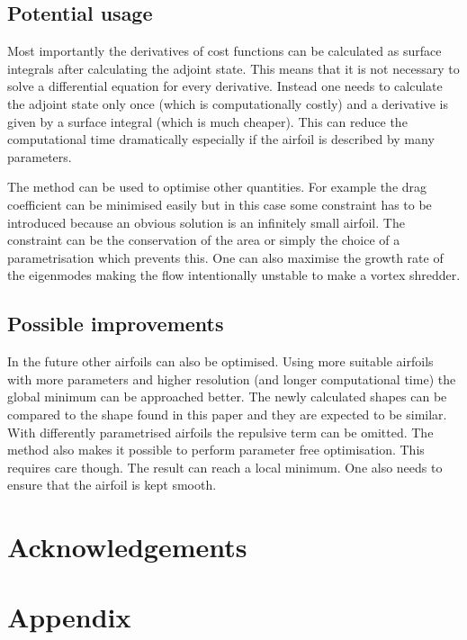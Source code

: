 \documentclass[12pt, a4paper]{article}
\begin{document}
        \subsection{Potential usage}
            Most importantly the derivatives of cost functions can be calculated as surface integrals after calculating the adjoint state. This means that it is not necessary to solve a differential equation for every derivative. Instead one needs to calculate the adjoint state only once (which is computationally costly) and a derivative is given by a surface integral (which is much cheaper). This can reduce the computational time dramatically especially if the airfoil is described by many parameters.
            
            The method can be used to optimise other quantities. For example the drag coefficient can be minimised easily but in this case some constraint has to be introduced because an obvious solution is an infinitely small airfoil. The constraint can be the conservation of the area or simply the choice of a parametrisation which prevents this. One can also maximise the growth rate of the eigenmodes making the flow intentionally unstable to make a vortex shredder.
            
        \subsection{Possible improvements}
            In the future other airfoils can also be optimised. Using more suitable airfoils with more parameters and higher resolution (and longer computational time) the global minimum can be approached better. The newly calculated shapes can be compared to the shape found in this paper and they are expected to be similar. With differently parametrised airfoils the repulsive term can be omitted. The method also makes it possible to perform parameter free optimisation. This requires care though. The result can reach a local minimum. One also needs to ensure that the airfoil is kept smooth.
            
\section*{Acknowledgements}

\appendix
\section*{Appendix}
\end{document}
